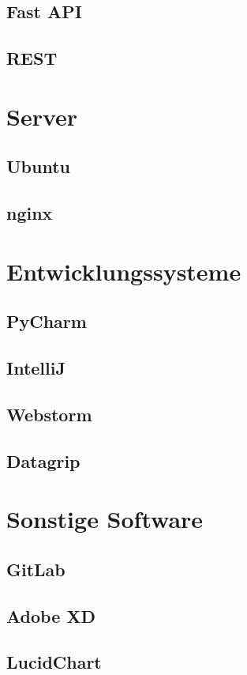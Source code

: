 \documentclass{report}
\begin{document}
\subsection{Fast API}
\subsection{REST}

\section{Server}
\subsection{Ubuntu}
\subsection{nginx}

\section{Entwicklungssysteme}
\subsection{PyCharm}
\subsection{IntelliJ}
\subsection{Webstorm}
\subsection{Datagrip}
\section{Sonstige Software}
\subsection{GitLab}
\subsection{Adobe XD}
\subsection{LucidChart}
\end{document}
